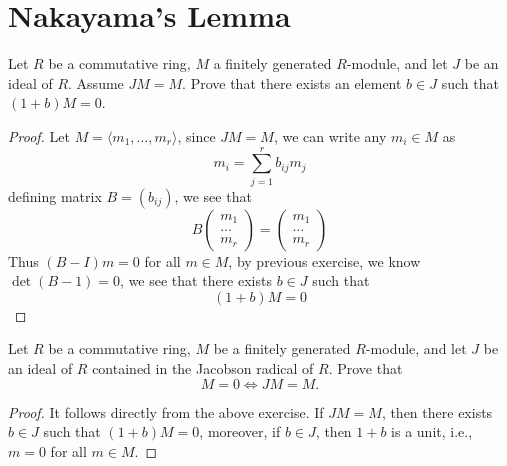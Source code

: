 \documentclass[openany]{book}
\newcommand{\la}{\langle}
\newcommand{\ra}{\rangle}
\begin{document}
\section{Nakayama's Lemma}

\begin{prob}[3.7]
    Let \( R \) be a commutative ring, \( M \) a finitely generated \( R \)-module, and let \( J \) be an ideal of \( R \). Assume \( JM = M \). Prove that there exists an element \( b \in J \) such that \((1 + b)M = 0\). 
\end{prob}
\begin{proof}
    Let $M=\la m_1,\dots, m_r\ra$, since $JM=M$, we can write any $m_i\in M$ as 
    \begin{equation*}
        m_i=\sum_{j=1}^rb_{ij}m_j
    \end{equation*}
    defining matrix $B=(b_{ij})$, we see that 
    \begin{equation*}
        B\begin{pmatrix}
            m_1\\
            \dots\\
            m_r
        \end{pmatrix}=\begin{pmatrix}
            m_1\\
            \dots\\
            m_r
        \end{pmatrix}
    \end{equation*}
    Thus $(B-I)m=0$ for all $m\in M$, by previous exercise, we know $\det(B-1)=0$, we see that there exists $b\in J$ such that 
    \begin{equation*}
        (1+b)M=0
    \end{equation*}
\end{proof}





\begin{prob}[3.8]
    Let \( R \) be a commutative ring, \( M \) be a finitely generated \( R \)-module, and let \( J \) be an ideal of \( R \) contained in the Jacobson radical of \( R \). Prove that 
\[
M = 0 \iff JM = M.
\] 
\end{prob}
\begin{proof}
    It follows directly from the above exercise. If $JM=M$, then there exists $b\in J$ such that $(1+b)M=0$, moreover, if $b\in J$, then $1+b$ is a unit, i.e., $m=0$ for all $m\in M$.
\end{proof}
\end{document}
